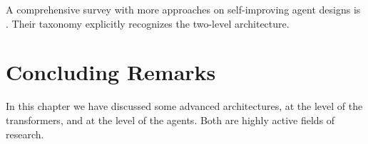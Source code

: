 A comprehensive survey with more approaches on self-improving agent designs is \citet{ren2026self}. Their taxonomy explicitly recognizes the two-level architecture.

\section{Concluding Remarks}
In this chapter we have discussed some advanced architectures,  at the level of the transformers, and at the level of the agents. Both are highly active fields of research.



